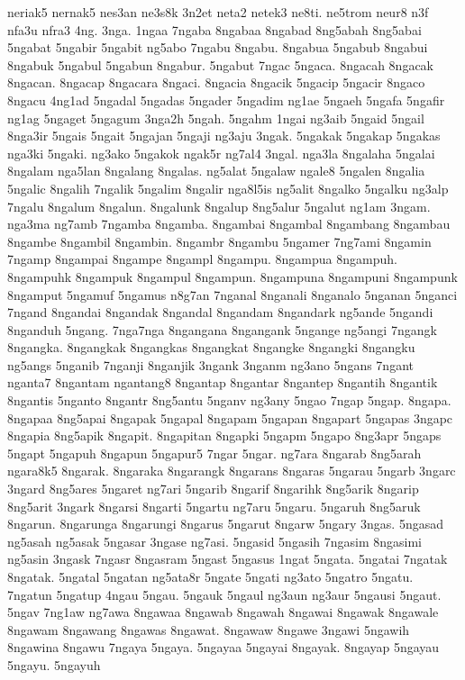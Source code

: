 {neriak5 nernak5 nes3an ne3s8k 3n2et neta2 netek3 ne8ti. ne5trom neur8 n3f
nfa3u nfra3 4ng. 3nga. 1ngaa 7ngaba 8ngabaa 8ngabad 8ng5abah 8ng5abai
5ngabat 5ngabir 5ngabit ng5abo 7ngabu 8ngabu. 8ngabua 5ngabub 8ngabui
8ngabuk 5ngabul 5ngabun 8ngabur. 5ngabut 7ngac 5ngaca. 8ngacah 8ngacak
8ngacan. 8ngacap 8ngacara 8ngaci. 8ngacia 8ngacik 5ngacip 5ngacir 8ngaco
8ngacu 4ng1ad 5ngadal 5ngadas 5ngader 5ngadim ng1ae 5ngaeh 5ngafa 5ngafir
ng1ag 5ngaget 5ngagum 3nga2h 5ngah. 5ngahm 1ngai ng3aib 5ngaid 5ngail
8nga3ir 5ngais 5ngait 5ngajan 5ngaji ng3aju 3ngak. 5ngakak 5ngakap 5ngakas
nga3ki 5ngaki. ng3ako 5ngakok ngak5r ng7al4 3ngal. nga3la 8ngalaha 5ngalai
8ngalam nga5lan 8ngalang 8ngalas. ng5alat 5ngalaw ngale8 5ngalen 8ngalia
5ngalic 8ngalih 7ngalik 5ngalim 8ngalir nga8l5is ng5alit 8ngalko 5ngalku
ng3alp 7ngalu 8ngalum 8ngalun. 8ngalunk 8ngalup 8ng5alur 5ngalut ng1am
3ngam. nga3ma ng7amb 7ngamba 8ngamba. 8ngambai 8ngambal 8ngambang 8ngambau
8ngambe 8ngambil 8ngambin. 8ngambr 8ngambu 5ngamer 7ng7ami 8ngamin 7ngamp
8ngampai 8ngampe 8ngampl 8ngampu. 8ngampua 8ngampuh. 8ngampuhk 8ngampuk
8ngampul 8ngampun. 8ngampuna 8ngampuni 8ngampunk 8ngamput 5ngamuf 5ngamus
n8g7an 7nganal 8nganali 8nganalo 5nganan 5nganci 7ngand 8ngandai 8ngandak
8ngandal 8ngandam 8ngandark ng5ande 5ngandi 8nganduh 5ngang. 7nga7nga
8ngangana 8ngangank 5ngange ng5angi 7ngangk 8ngangka. 8ngangkak 8ngangkas
8ngangkat 8ngangke 8ngangki 8ngangku ng5angs 5nganib 7nganji 8nganjik
3ngank 3nganm ng3ano 5ngans 7ngant nganta7 8ngantam ngantang8 8ngantap
8ngantar 8ngantep 8ngantih 8ngantik 8ngantis 5nganto 8ngantr 8ng5antu
5nganv ng3any 5ngao 7ngap 5ngap. 8ngapa. 8ngapaa 8ng5apai 8ngapak 5ngapal
8ngapam 5ngapan 8ngapart 5ngapas 3ngapc 8ngapia 8ng5apik 8ngapit.
8ngapitan 8ngapki 5ngapm 5ngapo 8ng3apr 5ngaps 5ngapt 5ngapuh 8ngapun
5ngapur5 7ngar 5ngar. ng7ara 8ngarab 8ng5arah ngara8k5 8ngarak. 8ngaraka
8ngarangk 8ngarans 8ngaras 5ngarau 5ngarb 3ngarc 3ngard 8ng5ares 5ngaret
ng7ari 5ngarib 8ngarif 8ngarihk 8ng5arik 8ngarip 8ng5arit 3ngark 8ngarsi
8ngarti 5ngartu ng7aru 5ngaru. 5ngaruh 8ng5aruk 8ngarun. 8ngarunga
8ngarungi 8ngarus 5ngarut 8ngarw 5ngary 3ngas. 5ngasad ng5asah ng5asak
5ngasar 3ngase ng7asi. 5ngasid 5ngasih 7ngasim 8ngasimi ng5asin 3ngask
7ngasr 8ngasram 5ngast 5ngasus 1ngat 5ngata. 5ngatai 7ngatak 8ngatak.
5ngatal 5ngatan ng5ata8r 5ngate 5ngati ng3ato 5ngatro 5ngatu. 7ngatun
5ngatup 4ngau 5ngau. 5ngauk 5ngaul ng3aun ng3aur 5ngausi 5ngaut. 5ngav
7ng1aw ng7awa 8ngawaa 8ngawab 8ngawah 8ngawai 8ngawak 8ngawale 8ngawam
8ngawang 8ngawas 8ngawat. 8ngawaw 8ngawe 3ngawi 5ngawih 8ngawina 8ngawu
7ngaya 5ngaya. 5ngayaa 5ngayai 8ngayak. 8ngayap 5ngayau 5ngayu. 5ngayuh
}

